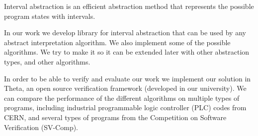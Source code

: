 Interval abstraction is an efficient abstraction method that represents the possible program states with intervals.

In our work we develop library for interval abstraction that can be used by any abstract interpretation algorithm. We also implement some of the possible algorithms. We try to make it so it can be extended later with other abstraction types, and other algorithms.

In order to be able to verify and evaluate our work we implement our solution in Theta, an
open source verification framework (developed in our university). We can compare the performance of the different algorithms on multiple types of programs, including industrial programmable logic controller (PLC) codes from CERN, and several types of programs from the Competition on Software Verification (SV-Comp).






